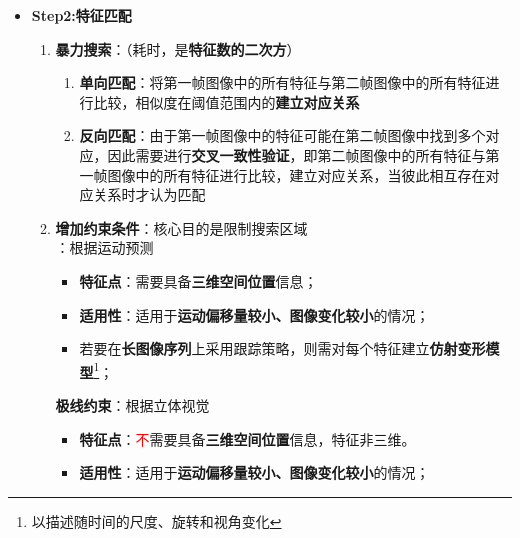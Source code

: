 \documentclass[../main.tex]{subfiles}
\begin{document}
\begin{enumerate}
\begin{itemize}
\begin{enumerate}
\begin{itemize}
                    \item \textbf{Step2:特征匹配}
                        \begin{enumerate}
                            \item \textbf{暴力搜索}：（耗时，是\textbf{特征数的二次方}）
                                \begin{enumerate}
                                    \item \textbf{单向匹配}：将第一帧图像中的所有特征与第二帧图像中的所有特征进行比较，相似度在阈值范围内的\textbf{建立对应关系}
                                    \item \textbf{反向匹配}：由于第一帧图像中的特征可能在第二帧图像中找到多个对应，因此需要进行\textbf{交叉一致性验证}，即第二帧图像中的所有特征与第一帧图像中的所有特征进行比较，建立对应关系，当彼此相互存在对应关系时才认为匹配
                                \end{enumerate}
                            \item \textbf{增加约束条件}：核心目的是限制搜索区域\\
                            \noindent\textbullet{}：根据运动预测
                                \begin{itemize}
                                    \item \textbf{特征点}：需要具备\textbf{三维空间位置}信息；
                                    \item \textbf{适用性}：适用于\textbf{运动偏移量较小、图像变化较小}的情况；
                                    \item 若要在\textbf{长图像序列}上采用跟踪策略，则需对每个特征建立\textbf{仿射变形模型}\footnote{以描述随时间的尺度、旋转和视角变化}；
                                \end{itemize}
                            \noindent\textbullet\quad \textbf{极线约束}：根据立体视觉
                                \begin{itemize}
                                    \item \textbf{特征点}：\textcolor{red}{不}需要具备\textbf{三维空间位置}信息，特征非三维。
                                    \item \textbf{适用性}：适用于\textbf{运动偏移量较小、图像变化较小}的情况；
                                \end{itemize}
                                                \begin{figure}[H]
                                                    \centering

\end{figure}
\end{enumerate}
\end{itemize}
\end{enumerate}
\end{itemize}
\end{enumerate}
\end{document}
